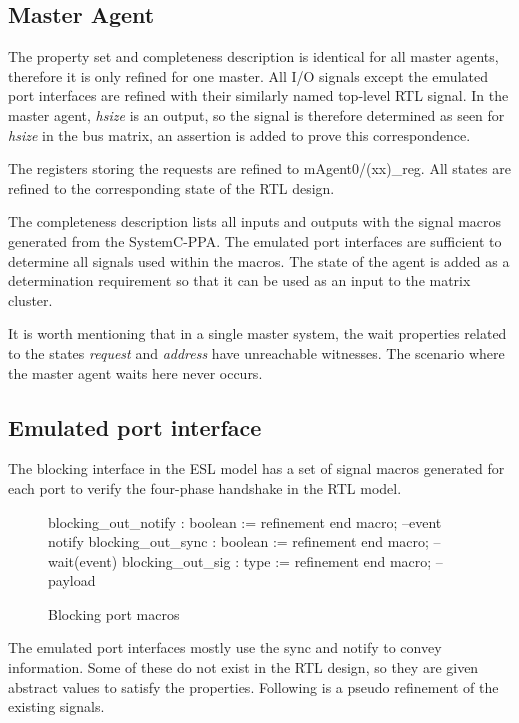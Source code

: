 \subsection{Master Agent}
The property set and completeness description is identical for all master agents, therefore it is only refined for one master. 
All I/O signals except the emulated port interfaces are refined with their similarly named top-level RTL signal. In the master agent, \textit{hsize} is an output, so the signal is therefore determined as seen for \textit{hsize} in the bus matrix, an assertion is added to prove this correspondence. \par
The registers storing the requests are refined to mAgent0/(xx)\_reg. All states are refined to the corresponding state of the RTL design.\par
The completeness description lists all inputs and outputs with the signal macros generated from the SystemC-PPA. The emulated port interfaces are sufficient to determine all signals used within the macros. The state of the agent is added as a determination requirement so that it can be used as an input to the matrix cluster. \par
It is worth mentioning that in a single master system, the wait properties related to the states \textit{request} and \textit{address} have unreachable witnesses. The scenario where the master agent waits here never occurs. 

\subsection{Emulated port interface}
\label{sub:em-port-refine}
The blocking interface in the ESL model has a set of signal macros generated for each port to verify the four-phase handshake in the RTL model.
\begin{figure}[h!]
\begin{VHI}
blocking_out_notify : boolean := refinement end macro; --event notify
blocking_out_sync : boolean := refinement end macro;   --wait(event)
blocking_out_sig : type := refinement end macro;       --payload
\end{VHI}
\caption{Blocking port macros}
\end{figure}

The emulated port interfaces mostly use the sync and notify to convey information. Some of these do not exist in the RTL design, so they are given abstract values to satisfy the properties. Following is a pseudo refinement of the existing signals. 

